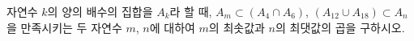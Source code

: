 자연수 $k$의 양의 배수의 집합을 $A_k$라 할 때, $A_m\subset(A_4\cap A_6)$, $(A_{12}\cup A_{18})\subset A_n$을 만족시키는 두 자연수 $m$, $n$에 대하여 $m$의 최솟값과 $n$의 최댓값의 곱을 구하시오.
